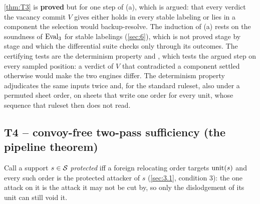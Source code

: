 \documentclass[12pt,a4paper]{article}
\begin{document}
\begin{status}
\cref{thm:T3} is \textbf{proved} but for one step of (a), which is argued: that every verdict the vacancy commit $V$ gives either holds in every stable labeling or lies in a component the selection would backup-resolve.
The induction of (a) rests on the soundness of $\operatorname{Eval}_3$ for stable labelings (\cref{sec:6}), which is not proved stage by stage and which the differential suite checks only through its outcomes.
The certifying tests are the determinism property and , which tests the argued step on every sampled position: a verdict of $V$ that contradicted a component settled otherwise would make the two engines differ.
The determinism property adjudicates the same inputs twice and, for the standard ruleset, also under a permuted sheet order, on sheets that write one order for every unit, whose sequence that ruleset then does not read.
\end{status}

\subsection{T4 -- convoy-free two-pass sufficiency (the pipeline theorem)}\label{sec:8.4}

Call a support $s \in \mathcal{S}$ \emph{protected} iff a foreign relocating order targets $\operatorname{unit}(s)$ and every such order is the protected attacker of $s$ (\cref{sec:3.1}, condition 3): the one attack on it is the attack it may not be cut by, so only the dislodgement of its unit can still void it.
\end{document}
